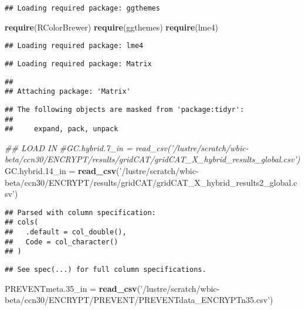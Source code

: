 \documentclass[]{article}
\newenvironment{Shaded}{\begin{snugshade}}{\end{snugshade}}
\newcommand{\CommentTok}[1]{\textcolor[rgb]{0.56,0.35,0.01}{\textit{#1}}}
\newcommand{\FloatTok}[1]{\textcolor[rgb]{0.00,0.00,0.81}{#1}}
\newcommand{\KeywordTok}[1]{\textcolor[rgb]{0.13,0.29,0.53}{\textbf{#1}}}
\newcommand{\NormalTok}[1]{#1}
\newcommand{\StringTok}[1]{\textcolor[rgb]{0.31,0.60,0.02}{#1}}
\begin{document}
\begin{verbatim}
## Loading required package: ggthemes
\end{verbatim}

\begin{Shaded}
\begin{Highlighting}[]
\KeywordTok{require}\NormalTok{(RColorBrewer)}
\KeywordTok{require}\NormalTok{(ggthemes)}
\KeywordTok{require}\NormalTok{(lme4)}
\end{Highlighting}
\end{Shaded}

\begin{verbatim}
## Loading required package: lme4
\end{verbatim}

\begin{verbatim}
## Loading required package: Matrix
\end{verbatim}

\begin{verbatim}
## 
## Attaching package: 'Matrix'
\end{verbatim}

\begin{verbatim}
## The following objects are masked from 'package:tidyr':
## 
##     expand, pack, unpack
\end{verbatim}

\begin{Shaded}
\begin{Highlighting}[]
\CommentTok{## LOAD IN}
\CommentTok{#GC.hybrid.7_in = read_csv('/lustre/scratch/wbic-beta/ccn30/ENCRYPT/results/gridCAT/gridCAT_X_hybrid_results_global.csv')}
\NormalTok{GC.hybrid}\FloatTok{.14}\NormalTok{_in =}\StringTok{ }\KeywordTok{read_csv}\NormalTok{(}\StringTok{'/lustre/scratch/wbic-beta/ccn30/ENCRYPT/results/gridCAT/gridCAT_X_hybrid_results2_global.csv'}\NormalTok{)}
\end{Highlighting}
\end{Shaded}

\begin{verbatim}
## Parsed with column specification:
## cols(
##   .default = col_double(),
##   Code = col_character()
## )
\end{verbatim}

\begin{verbatim}
## See spec(...) for full column specifications.
\end{verbatim}

\begin{Shaded}
\begin{Highlighting}[]
\NormalTok{PREVENTmeta}\FloatTok{.35}\NormalTok{_in =}\StringTok{ }\KeywordTok{read_csv}\NormalTok{(}\StringTok{'/lustre/scratch/wbic-beta/ccn30/ENCRYPT/PREVENT/PREVENTdata_ENCRYPTn35.csv'}\NormalTok{)}
\end{Highlighting}
\end{Shaded}
\end{document}
